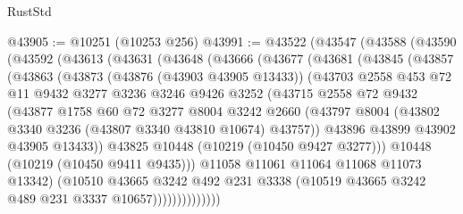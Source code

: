 \begin{lexlean}{RustStd}
\begin{coremodule}
@43905 := @10251 (@10253 @256)
@43991 := @43522
    (@43547
      (@43588
        (@43590
          (@43592
            (@43613
              (@43631
                (@43648
                  (@43666
                    (@43677
                      (@43681
                        (@43845
                          (@43857
                            (@43863
                              (@43873
                                (@43876 (@43903 @43905 @13433))
                                (@43703
                                  @2558
                                  @453
                                  @72
                                  @11
                                  @9432
                                  @3277
                                  @3236
                                  @3246
                                  @9426
                                  @3252
                                  (@43715
                                    @2558
                                    @72
                                    @9432
                                    (@43877
                                      @1758
                                      @60
                                      @72
                                      @3277
                                      @8004
                                      @3242
                                      @2660
                                      (@43797
                                        @8004
                                        (@43802 @3340 @3236 (@43807 @3340 @43810 @10674) @43757))
                                      @43896
                                      @43899
                                      @43902
                                      @43905
                                      @13433))
                                  @43825
                                  @10448
                                  (@10219 (@10450 @9427 @3277)))
                                @10448
                                (@10219 (@10450 @9411 @9435)))
                              @11058
                              @11061
                              @11064
                              @11068
                              @11073
                              @13342)
                            (@10510
                              @43665
                              @3242
                              @492
                              @231
                              @3338
                              (@10519 @43665 @3242 @489 @231 @3337 @10657))))))))))))))

\end{coremodule}
\end{lexlean}
